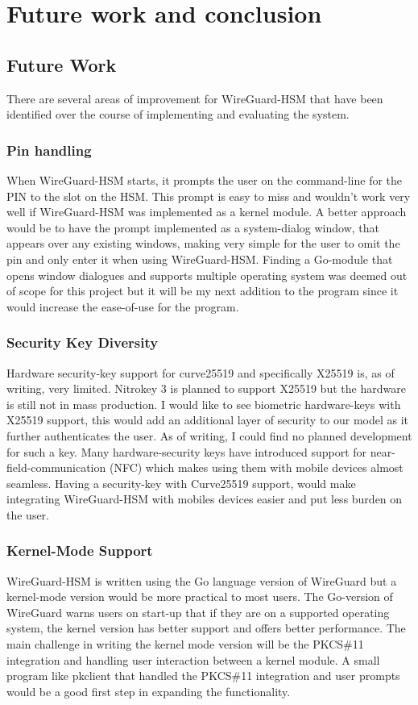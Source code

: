 \documentclass [11pt, proquest] {uwthesis}[2020/02/24]
\begin{document}
\chapter {Future work and conclusion}

\section {Future Work}
There are several areas of improvement for WireGuard-HSM that have been identified over the course of implementing and evaluating the system. 

\subsection{Pin handling}
When WireGuard-HSM starts, it prompts the user on the command-line for the PIN to the slot on the HSM. 
This prompt is easy to miss and wouldn't work very well if WireGuard-HSM was implemented as a kernel module. A better approach would be to have the prompt implemented as a system-dialog window, that appears over any existing windows, making very simple for the user to omit the pin and only enter it when using WireGuard-HSM. Finding a Go-module that opens window dialogues and supports multiple operating system was deemed out of scope for this project but it will be my next addition to the program since it would increase the ease-of-use for the program. 
 
\subsection{Security Key Diversity}
Hardware security-key support for curve25519 and specifically X25519 is, as of writing, very limited. Nitrokey 3 is planned to support X25519 but the hardware is still not in mass production. I would like to see biometric hardware-keys with X25519 support, this would add an additional layer of security to our model as it further authenticates the user. As of writing, I could find no planned development for such a key. Many hardware-security keys have introduced support for near-field-communication (NFC) which makes using them with mobile devices almost seamless. Having a security-key with Curve25519 support, would make integrating WireGuard-HSM with mobiles devices easier and put less burden on the user. 

\subsection{Kernel-Mode Support}
WireGuard-HSM is written using the Go language version of WireGuard but a kernel-mode version would be more practical to most users. The Go-version of WireGuard warns users on start-up that if they are on a supported operating system, the kernel version has better support and offers better performance. The main challenge in writing the kernel mode version will be the PKCS\#11 integration and handling user interaction between a kernel module. A small program like pkclient that handled the PKCS\#11 integration and user prompts would be a good first step in expanding the functionality.
\end{document}
